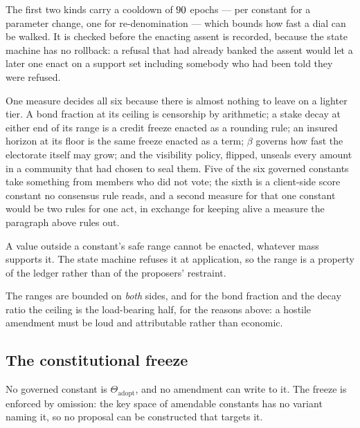 The first two kinds carry a cooldown of $90$ epochs --- per constant
for a parameter change, one for re-denomination --- which bounds how fast a dial can be
walked. It is checked before the enacting assent is recorded, because the state machine
has no rollback: a refusal that had already banked the assent would let a later one enact
on a support set including somebody who had been told they were refused.

One measure decides all six because there is almost nothing to leave on a lighter tier.
A bond fraction at its ceiling is censorship by arithmetic; a stake decay at either end of
its range is a credit freeze enacted as a rounding rule; an insured horizon at its floor
is the same freeze enacted as a term; $\beta$ governs how fast the electorate itself may
grow; and the visibility policy, flipped, unseals every amount in a community that had
chosen to seal them. Five of the six governed constants take something from members who
did not vote; the sixth is a client-side score constant no consensus rule reads, and a
second measure for that one constant would be two rules for one act, in exchange for
keeping alive a measure the paragraph above rules out.

\begin{property}
\label{prop:saferange}
A value outside a constant's safe range cannot be enacted, whatever mass supports it.
The state machine refuses it at application, so the range is a property of the ledger
rather than of the proposers' restraint.
\end{property}

The ranges are bounded on \emph{both} sides, and for the bond fraction and the decay
ratio the ceiling is the load-bearing half, for the reasons above: a hostile amendment
must be loud and attributable rather than economic.

\subsection{The constitutional freeze}

\begin{property}
\label{prop:freeze}
No governed constant is $\Theta_{\mathrm{adopt}}$, and no amendment can write to it. The
freeze is enforced by omission: the key space of amendable constants has no variant
naming it, so no proposal can be constructed that targets it.
\end{property}

